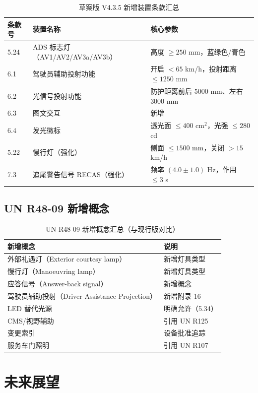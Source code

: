 \begin{table}[H]
\centering
\caption{草案版 V4.3.5 新增装置条款汇总}
\begin{tabular}{|l|l|l|}
\hline
\textbf{条款号} & \textbf{装置名称} & \textbf{核心参数} \\
\hline
5.24 & ADS 标志灯（AV1/AV2/AV3a/AV3b）& 高度 $\ge 250$ mm，蓝绿色/青色 \\
\hline
6.1 & 驾驶员辅助投射功能 & 开启 $< 65$ km/h，投射距离 $\le 1250$ mm \\
\hline
6.2 & 光信号投射功能 & 防护距离前后 5000 mm、左右 3000 mm \\
\hline
6.3 & 图文交互 & 新增 \\
\hline
6.4 & 发光徽标 & 透光面 $\le 400$ cm$^2$，光强 $\le 280$ cd \\
\hline
5.22 & 慢行灯（强化）& 侧面 $\le 1500$ mm，关闭 $> 15$ km/h \\
\hline
7.3 & 追尾警告信号 RECAS（强化）& 频率 $(4.0 \pm 1.0)$ Hz，作用 $\le 3$ s \\
\hline
\end{tabular}
\end{table}

\subsection{UN R48-09 新增概念}

\begin{table}[H]
\centering
\caption{UN R48-09 新增概念汇总（与现行版对比）}
\begin{tabular}{|l|l|}
\hline
\textbf{新增概念} & \textbf{说明} \\
\hline
外部礼遇灯（Exterior courtesy lamp）& 新增灯具类型 \\
\hline
慢行灯（Manoeuvring lamp）& 新增灯具类型 \\
\hline
应答信号（Answer-back signal）& 新增概念 \\
\hline
驾驶员辅助投射（Driver Assistance Projection）& 新增附录 16 \\
\hline
LED 替代光源 & 明确允许（5.34）\\
\hline
CMS/视野辅助 & 引用 UN R125 \\
\hline
变更索引 & 设备批准追踪 \\
\hline
服务车门照明 & 引用 UN R107 \\
\hline
\end{tabular}
\end{table}

\section{未来展望}

